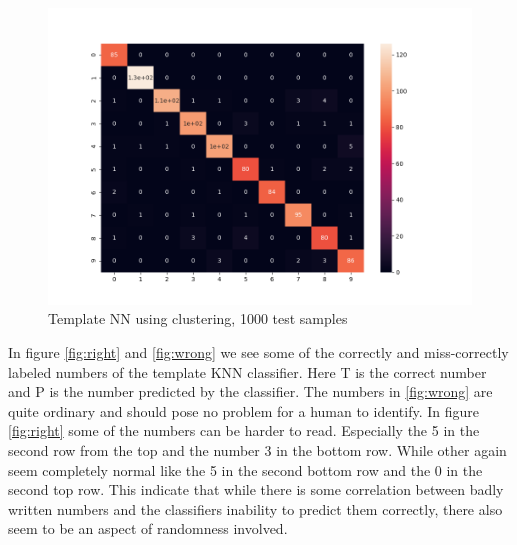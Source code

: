 \documentclass{article}
\begin{document}
\begin{figure}[htbp]
  \centering
  \includegraphics[width=\textwidth]{confusion_matrixes/Cluster_1000.png} 
  \caption{Template NN using clustering, 1000 test samples}
  \label{fig:ckustr_1000}
\end{figure}

In figure \ref{fig:right} and \ref{fig:wrong} we see some of the correctly and miss-correctly labeled numbers of the template KNN classifier. Here T is the correct number and P is the number predicted by the classifier. The numbers in \ref{fig:wrong} are quite ordinary and should pose no problem for a human to identify. In figure \ref{fig:right} some of the numbers can be harder to read. Especially the 5 in the second row from the top and the number 3 in the bottom row. While other again seem completely normal like the 5 in the second bottom row and the 0 in the second top row. This indicate that while there is some correlation between badly written numbers and the classifiers inability to predict them correctly, there also seem to be an aspect of randomness involved.  
\end{document}
